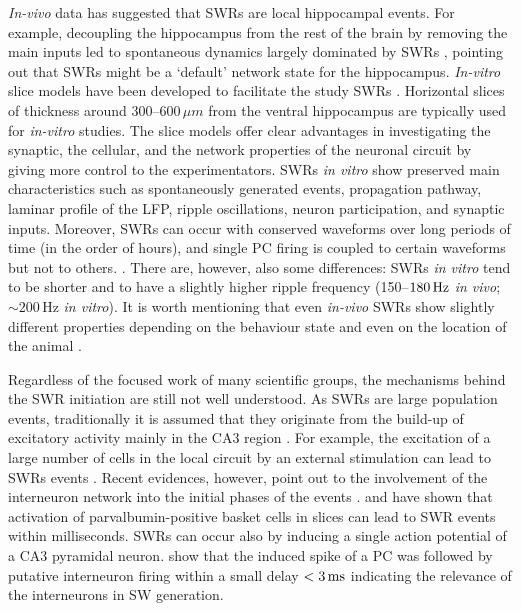     \textit{In-vivo} data has suggested that SWRs are local hippocampal events.
    For example, decoupling the hippocampus from the rest of the brain by
    removing the main inputs led to spontaneous dynamics largely dominated by
    SWRs \citep{Buzsaki1983}, pointing out that SWRs might be a `default'
    network state for the hippocampus. \textit{In-vitro} slice models have been
    developed to facilitate the study SWRs \cite[e.g.,][]{Maier2002, Maier2003,
    Kubota2003, Colgin2004}. Horizontal slices of thickness around 300--$600\,
    \mu m$ from the ventral hippocampus are typically used for \textit{in-vitro}
    studies. The slice models offer clear advantages in investigating the
    synaptic, the cellular, and the network properties of the neuronal circuit
    by giving more control to the experimentators. SWRs \textit{in vitro} show
    preserved main characteristics such as spontaneously generated events,
    propagation pathway, laminar profile of the LFP, ripple oscillations,
    neuron participation, and synaptic inputs. Moreover, SWRs can occur with
    conserved waveforms over long periods of time (in the order of hours), and
    single PC firing is coupled to certain waveforms but not to others.
    \citep{Reichinnek2010}. There are, however, also some differences: SWRs
    \textit{in vitro} tend to be shorter and to have a slightly higher ripple
    frequency (150--$180 \,\rm Hz$ \textit{in vivo}; $\sim 200$\,\rm Hz \textit{in
    vitro}). It is worth mentioning that even \textit{in-vivo} SWRs show
    slightly different properties depending on the behaviour state and even on
    the location of the animal \citep{Buzsaki2015}.
    
    Regardless of the focused work of many scientific groups, the mechanisms
    behind the SWR initiation are still not well understood. As SWRs are large
    population events, traditionally it is assumed that they originate from the
    build-up of excitatory activity mainly in the CA3 region
    \citep{delaPrida2006, Ellender2010, Schlingloff2014, Hulse2016}. For
    example, the excitation of a large number of cells in the local circuit by
    an external stimulation can lead to SWRs events \citep{Behrens2005,
    Nimmrich2005, Both2008}. Recent evidences, however, point out to the
    involvement of the interneuron network into the initial phases of the
    events \citep{Sasaki2014, Bazelot2016}. \cite{Schlingloff2014} and
    \cite{Kohus2016} have shown that activation of parvalbumin-positive basket
    cells in slices can lead to SWR events within milliseconds. SWRs can occur
    also by inducing a single action potential of a CA3 pyramidal neuron.
    \cite{Bazelot2016} show that the induced spike of a PC was followed by
    putative interneuron firing within a small delay $<3\,\rm ms$ indicating
    the relevance of the interneurons in SW generation.

